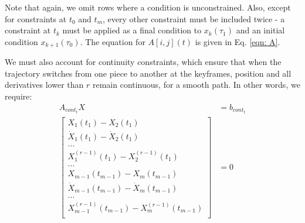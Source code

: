 \documentclass[11pt]{article}
\begin{document}
Note that again, we omit rows where a condition is unconstrained. Also, except for constraints at $t_0$ and $t_m$, every other constraint must be included twice - a constraint at $t_k$ must be applied as a final condition to $x_{k}(\tau_1)$ and an initial condition $x_{k+1}(\tau_0)$. The equation for $A[i, j] (t)$ is given in Eq. \ref{eqn: A}. 

\mbox{} \newline
We must also account for continuity constraints, which ensure that when the trajectory switches from one piece to another at the keyframes, position and all derivatives lower than $r$ remain continuous, for a smooth path. In other words, we require:
\begin{align*}
A_{cont_t} X &= b_{cont_t} \\
\begin{bmatrix}
  X_1 (t_1) - X_2(t_1) \\
  \dot{X}_1 (t_1) - \dot{X}_2 (t_1) \\
  ... \\
  X^{(r-1)}_1 (t_1) - X^{(r-1)}_2 (t_1) \\
    ... \\
  X_{m-1} (t_{m-1}) - X_{m} (t_{m-1}) \\
  \dot{X}_{m-1} (t_{m-1}) - \dot{X}_{m} (t_{m-1}) \\
  ... \\
  X^{(r-1)}_{m-1} (t_{m-1}) - X^{(r-1)}_m (t_{m-1}) \\
 \end{bmatrix} 
 &=
 0 
 \end{align*}
 
\end{document}
